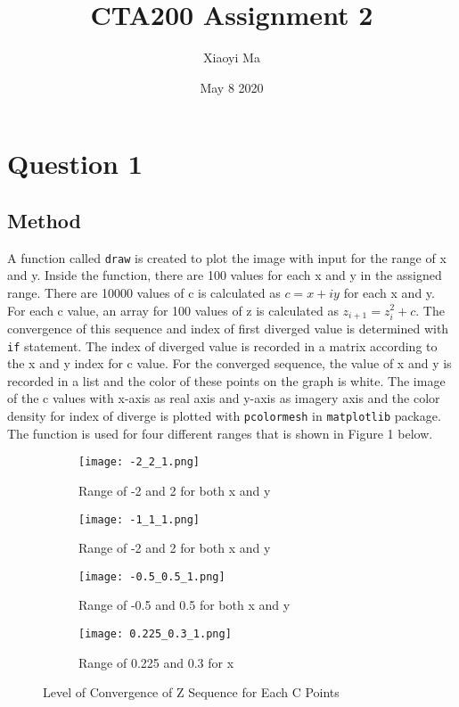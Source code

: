 \documentclass[12pt]{article}
\title{CTA200 Assignment 2}
\author{Xiaoyi Ma}
\date{May 8 2020}
\begin{document}
\maketitle


\section{Question 1}

\subsection{Method}
A function called \texttt{draw} is created to plot the image with input for the range of x and y. Inside the function, there are 100 values for each x and y in the assigned range. There are 10000 values of c is calculated as $c=x+iy$ for each x and y. For each c value, an array for 100 values of z is calculated as $z_{i+1}=z_i^2+c$\cite{Lab}. The convergence of this sequence and index of first diverged value is determined with \texttt{if} statement. The index of diverged value is recorded in a matrix according to the x and y index for c value. For the converged sequence, the value of x and y is recorded in a list and the color of these points on the graph is white. The image of the c values with x-axis as real axis and y-axis as imagery axis and the color density for index of diverge is plotted with \texttt{pcolormesh} in \texttt{matplotlib} package. The function is used for four different ranges that is shown in Figure 1 below.

\begin{figure}[h]
\centering
\begin{subfigure}{.49\textwidth}
  \centering
  \texttt{[image: -2\_2\_1.png]}
  \caption{Range of -2 and 2 for both x and y}
\end{subfigure}%
\begin{subfigure}{.49\textwidth}
  \centering
  \texttt{[image: -1\_1\_1.png]}
  \caption{Range of -2 and 2 for both x and y }
 \end{subfigure}
 \begin{subfigure}{.49\textwidth}
  \centering
  \texttt{[image: -0.5\_0.5\_1.png]}
  \caption{Range of -0.5 and 0.5 for both x and y }
 \end{subfigure}
 \begin{subfigure}{.49\textwidth}
  \centering
  \texttt{[image: 0.225\_0.3\_1.png]}
  \caption{Range of 0.225 and 0.3 for x}
 \end{subfigure}
\caption{Level of Convergence of Z Sequence for Each C Points}
\label{fig 1}
\end{figure}
\end{document}
